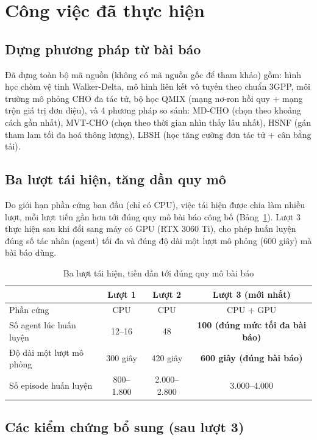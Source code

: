 \documentclass[12pt,a4paper]{article}
\begin{document}
\section{Công việc đã thực hiện}

\subsection{Dựng phương pháp từ bài báo}

Đã dựng toàn bộ mã nguồn (không có mã nguồn gốc để tham khảo) gồm: hình học chòm vệ tinh
Walker-Delta, mô hình liên kết vô tuyến theo chuẩn 3GPP, môi trường mô phỏng CHO đa tác tử,
bộ học QMIX (mạng nơ-ron hồi quy + mạng trộn giá trị đơn điệu), và 4 phương pháp so sánh:
MD-CHO (chọn theo khoảng cách gần nhất), MVT-CHO (chọn theo thời gian nhìn thấy lâu nhất),
HSNF (gán tham lam tối đa hoá thông lượng), LBSH (học tăng cường đơn tác tử + cân bằng tải).

\subsection{Ba lượt tái hiện, tăng dần quy mô}

Do giới hạn phần cứng ban đầu (chỉ có CPU), việc tái hiện được chia làm nhiều lượt, mỗi lượt
tiến gần hơn tới đúng quy mô bài báo công bố (Bảng~\ref{tab:rounds}). Lượt 3 thực hiện sau khi
đổi sang máy có GPU (RTX 3060 Ti), cho phép huấn luyện đúng số tác nhân (agent) tối đa và đúng
độ dài một lượt mô phỏng (600 giây) mà bài báo dùng.

\begin{table}[h]
\centering
\caption{Ba lượt tái hiện, tiến dần tới đúng quy mô bài báo}
\label{tab:rounds}
\begin{tabular}{lccc}
\toprule
 & \textbf{Lượt 1} & \textbf{Lượt 2} & \textbf{Lượt 3 (mới nhất)} \\
\midrule
Phần cứng          & CPU     & CPU     & CPU + GPU \\
Số agent lúc huấn luyện & 12--16  & 48      & \textbf{100 (đúng mức tối đa bài báo)} \\
Độ dài một lượt mô phỏng & 300 giây & 420 giây & \textbf{600 giây (đúng bài báo)} \\
Số episode huấn luyện   & 800--1.800 & 2.000--2.800 & 3.000--4.000 \\
\bottomrule
\end{tabular}
\end{table}

\subsection{Các kiểm chứng bổ sung (sau lượt 3)}
\end{document}
